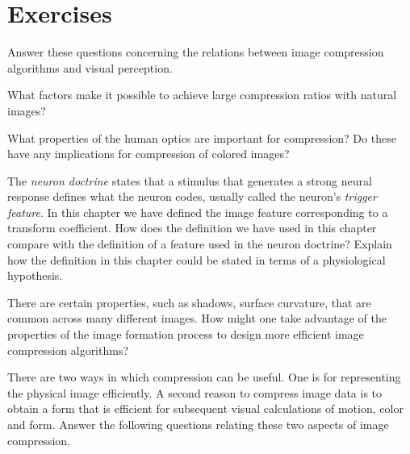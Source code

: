 %
%
\nocite{Adelson1987,Burt1983a,Burt1983b}
\nocite{Kersten1987}
\nocite{Mallat1989}
\nocite{Vetterli1984,Vetterli1986}
%
%
%
\newpage
\section*{Exercises}

\be

\item Answer these questions concerning the relations
between image compression algorithms and visual perception.

 \be

 \item What factors make it possible to achieve large compression
ratios with natural images?

 \item What properties of the human optics are important for
compression?  Do these have any implications for compression of
colored images?

 \item The {\em neuron doctrine} states that a stimulus that generates
a strong neural response defines what the neuron codes, usually called
the neuron's {\em trigger feature}.  In this chapter we have defined
the image feature corresponding to a transform coefficient.  How does
the definition we have used in this chapter compare with the
definition of a feature used in the neuron doctrine?  Explain how the
definition in this chapter could be stated in terms of a physiological
hypothesis.

 \item There are certain properties, such as shadows, surface
curvature, that are common across many different images.  How might
one take advantage of the properties of the image formation process to
design more efficient image compression algorithms?

 \ee

\item  There are two ways in which compression can be useful.
One is for representing the physical image efficiently.  A second
reason to compress image data is to obtain a form that is efficient
for subsequent visual calculations of motion, color and form.  Answer
the following questions relating these two aspects of image
compression.

